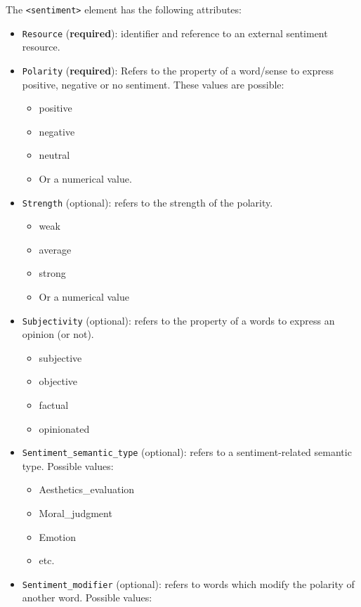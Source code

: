 
The \texttt{<sentiment>} element has the following attributes:
\begin{itemize}
\item \texttt{Resource} (\textbf{required}): identifier and reference to an external sentiment
  resource.
\item \texttt{Polarity} (\textbf{required}): Refers to the property of a
  word/sense to express positive, negative or no sentiment. These values are
  possible:
  \begin{itemize}
  \item positive
  \item negative
  \item neutral
  \item Or a numerical value.
  \end{itemize}
\item \texttt{Strength} (optional): refers to the strength of the polarity.
  \begin{itemize}
  \item weak
  \item average
  \item strong
  \item Or a numerical value
  \end{itemize}
\item \texttt{Subjectivity} (optional): refers to the property of a words to express an
  opinion (or not).
  \begin{itemize}
  \item subjective
  \item objective
  \item factual
  \item opinionated
  \end{itemize}
\item \texttt{Sentiment\_semantic\_type} (optional): refers to a
  sentiment-related semantic type. Possible values:
  \begin{itemize}
  \item Aesthetics\_evaluation
  \item Moral\_judgment
  \item Emotion
  \item etc.
  \end{itemize}
\item \texttt{Sentiment\_modifier} (optional): refers to words which modify
  the polarity of another word. Possible values:
  \begin{itemize}

\end{itemize}
\end{itemize}
